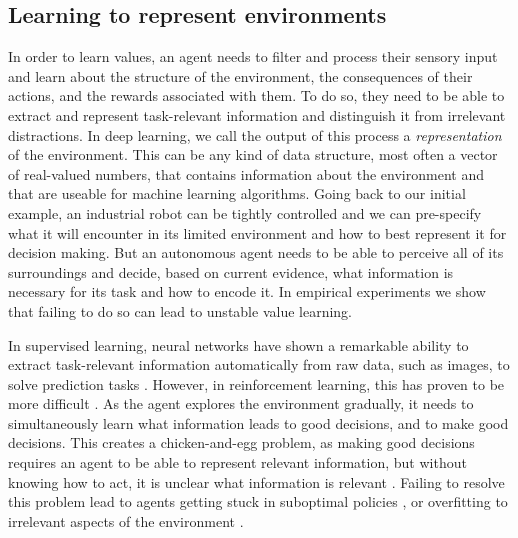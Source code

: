 \subsection{Learning to represent environments}


In order to learn values, an agent needs to filter and process their sensory input and learn about the structure of the environment, the consequences of their actions, and the rewards associated with them.
To do so, they need to be able to extract and represent task-relevant information and distinguish it from irrelevant distractions.
In deep learning, we call the output of this process a \emph{representation} of the environment.
This can be any kind of data structure, most often a vector of real-valued numbers, that contains information about the environment and that are useable for machine learning algorithms.
Going back to our initial example, an industrial robot can be tightly controlled and we can pre-specify what it will encounter in its limited environment and how to best represent it for decision making.
But an autonomous agent needs to be able to perceive all of its surroundings and decide, based on current evidence, what information is necessary for its task and how to encode it.
In empirical experiments \parencite{hussing2024dissecting,voelcker2024when,voelcker2022value} we show that failing to do so can lead to unstable value learning.

In supervised learning, neural networks have shown a remarkable ability to extract task-relevant information automatically from raw data, such as images, to solve prediction tasks \parencite{goodfellow2016deep}.
However, in reinforcement learning, this has proven to be more difficult \parencite{jaderberg2017reinforcement,igl2021transient,lyle2021effect,kumar2021implicit,nikishin2022primacy,hussing2024dissecting}.
As the agent explores the environment gradually, it needs to simultaneously learn what information leads to good decisions, and to make good decisions.
This creates a chicken-and-egg problem, as making good decisions requires an agent to be able to represent relevant information, but without knowing how to act, it is unclear what information is relevant \parencite{igl2021transient,voelcker2022value}.
Failing to resolve this problem lead to agents getting stuck in suboptimal policies \parencite{kumar2021implicit,nikishin2022primacy}, or overfitting to irrelevant aspects of the environment \parencite{song2020observational}.

